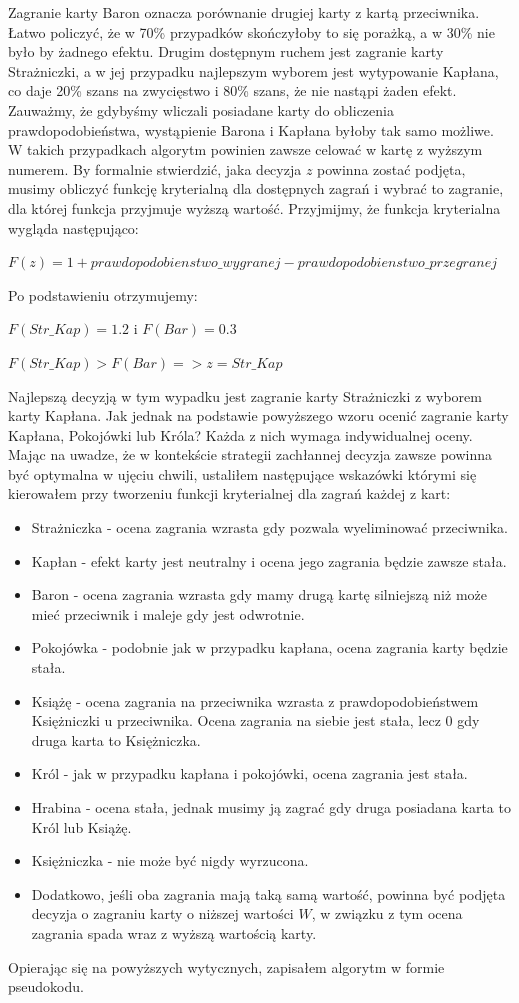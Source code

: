 Zagranie karty Baron oznacza porównanie drugiej karty z kartą przeciwnika. Łatwo policzyć, że w 70\% przypadków skończyłoby to się porażką, a w 30\% nie było by żadnego efektu. Drugim dostępnym ruchem jest zagranie karty Strażniczki, a w jej przypadku najlepszym wyborem jest wytypowanie Kapłana, co daje 20\% szans na zwycięstwo i 80\% szans, że nie nastąpi żaden efekt. Zauważmy, że gdybyśmy wliczali posiadane karty do obliczenia prawdopodobieństwa, wystąpienie Barona i Kapłana byłoby tak samo możliwe. W takich przypadkach algorytm powinien zawsze celować w kartę z wyższym numerem. By formalnie stwierdzić, jaka decyzja $z$ powinna zostać podjęta, musimy obliczyć funkcję kryterialną dla dostępnych zagrań i wybrać to zagranie, dla której funkcja przyjmuje wyższą wartość. Przyjmijmy, że funkcja kryterialna wygląda następująco:

\begin{center}
	$F(z) = 1 + prawdopodobienstwo\_wygranej - prawdopodobienstwo\_przegranej$
\end{center}
Po podstawieniu otrzymujemy:
\begin{center}
 $F(Str\_Kap)=1.2$ i $F(Bar) = 0.3$
 
 $F(Str\_Kap)>F(Bar) => z = Str\_Kap$ 
\end{center} 

Najlepszą decyzją w tym wypadku jest zagranie karty Strażniczki z wyborem karty Kapłana. Jak jednak na podstawie powyższego wzoru ocenić zagranie karty Kapłana, Pokojówki lub Króla? Każda z nich wymaga indywidualnej oceny. Mając na uwadze, że w kontekście strategii zachłannej decyzja zawsze powinna być optymalna w ujęciu chwili, ustaliłem następujące wskazówki którymi się kierowałem przy tworzeniu funkcji kryterialnej dla zagrań każdej z kart:
\begin{itemize}
	\item Strażniczka - ocena zagrania wzrasta gdy pozwala wyeliminować przeciwnika.
	\item Kapłan - efekt karty jest neutralny i ocena jego zagrania będzie zawsze stała.
	\item Baron - ocena zagrania wzrasta gdy mamy drugą kartę silniejszą niż może mieć przeciwnik i maleje gdy jest odwrotnie.
	\item Pokojówka - podobnie jak w przypadku kapłana, ocena zagrania karty będzie stała.
	\item Książę - ocena zagrania na przeciwnika wzrasta z prawdopodobieństwem Księżniczki u przeciwnika. Ocena zagrania na siebie jest stała, lecz 0 gdy druga karta to Księżniczka.
	\item Król - jak w przypadku kapłana i pokojówki, ocena zagrania jest stała.
	\item Hrabina - ocena stała, jednak musimy ją zagrać gdy druga posiadana karta to Król lub Książę.
	\item Księżniczka - nie może być nigdy wyrzucona.
	\item Dodatkowo, jeśli oba zagrania mają taką samą wartość, powinna być podjęta decyzja o zagraniu karty o niższej wartości $W$, w związku z tym ocena zagrania spada wraz z wyższą wartością karty.
\end{itemize}
Opierając się na powyższych wytycznych, zapisałem algorytm w formie pseudokodu.
